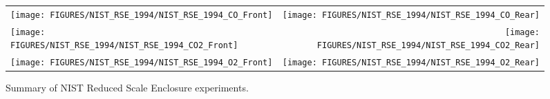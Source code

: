\newpage

\begin{figure}[p]
\begin{tabular*}{\textwidth}{l@{\extracolsep{\fill}}r}
\texttt{[image: FIGURES/NIST\_RSE\_1994/NIST\_RSE\_1994\_CO\_Front]} &
\texttt{[image: FIGURES/NIST\_RSE\_1994/NIST\_RSE\_1994\_CO\_Rear]} \\
\texttt{[image: FIGURES/NIST\_RSE\_1994/NIST\_RSE\_1994\_CO2\_Front]} &
\texttt{[image: FIGURES/NIST\_RSE\_1994/NIST\_RSE\_1994\_CO2\_Rear]} \\
\texttt{[image: FIGURES/NIST\_RSE\_1994/NIST\_RSE\_1994\_O2\_Front]} &
\texttt{[image: FIGURES/NIST\_RSE\_1994/NIST\_RSE\_1994\_O2\_Rear]}
\end{tabular*}
\caption[Summary of NIST Reduced Scale Enclosure experiments]{Summary of NIST Reduced Scale Enclosure experiments.}
\label{NIST_RSE_1994}
\end{figure}


